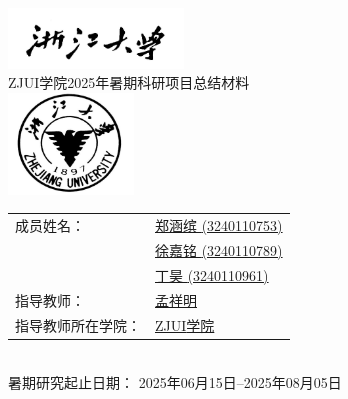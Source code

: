 \documentclass[12pt,a4paper]{article}
\begin{document}
\begin{titlepage}
    \centering
    \includegraphics[width=0.35\textwidth]{zju_name.png} \\[2em]

    {\fontsize{24pt}{28pt}\selectfont
        {
            {\textrm{ZJUI}}学院{\textrm{2025}}年暑期科研项目总结材料
        }
    }\\[3em]

    \includegraphics[width=0.25\textwidth]{zju_icon.png} \\[5em]

    {
    \begin{tabular}{@{}l l@{}}
    成员姓名： & \uline{郑涵缤 \textrm{(3240110753)}} \\[0.5em]
               & \uline{徐嘉铭 \textrm{(3240110789)}} \\[0.5em]
               & \uline{丁昊 \textrm{(3240110961)}} \\[1.2em]
    指导教师： & \uline{孟祥明} \\[1.2em]
    指导教师所在学院： & \uline{\textrm{ZJUI}学院} \\
    \end{tabular}
    }\\[3em]

    {\fontsize{14pt}{17pt}\selectfont
         暑期研究起止日期：
        {\textrm{2025年06月15日--2025年08月05日}}
    }

    \vfill
\end{titlepage}
\end{document}
